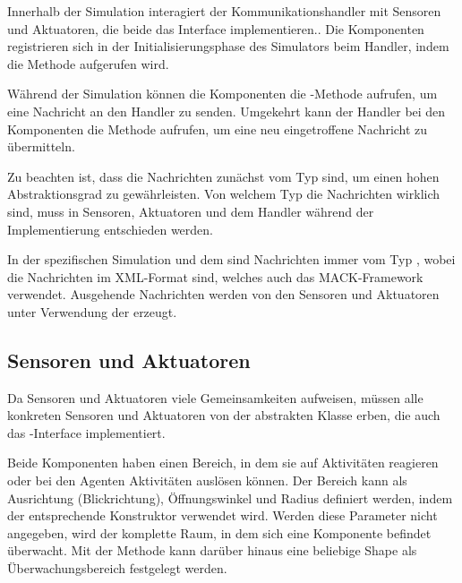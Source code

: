 Innerhalb der Simulation interagiert der Kommunikationshandler mit Sensoren und Aktuatoren, die beide das Interface  implementieren.. Die Komponenten registrieren sich in der Initialisierungsphase des Simulators beim Handler, indem die Methode  aufgerufen wird.

Während der Simulation können die Komponenten die -Methode aufrufen, um eine Nachricht an den Handler zu senden. Umgekehrt kann der Handler bei den Komponenten die Methode  aufrufen, um eine neu eingetroffene Nachricht zu übermitteln.

Zu beachten ist, dass die Nachrichten zunächst vom Typ  sind, um einen hohen Abstraktionsgrad zu gewährleisten. Von welchem Typ die Nachrichten wirklich sind, muss in Sensoren, Aktuatoren und dem Handler während der Implementierung entschieden werden.

In der spezifischen Simulation und dem  sind Nachrichten immer vom Typ , wobei die Nachrichten im XML-Format sind, welches auch das MACK-Framework verwendet. Ausgehende Nachrichten werden von den Sensoren und Aktuatoren unter Verwendung der  erzeugt.


\subsection{Sensoren und Aktuatoren}\label{subsec:concept_actuators_sensors}
Da Sensoren und Aktuatoren viele Gemeinsamkeiten aufweisen, müssen alle konkreten Sensoren und Aktuatoren von der abstrakten Klasse  erben, die auch das -Interface implementiert.

Beide Komponenten haben einen Bereich, in dem sie auf Aktivitäten reagieren oder bei den Agenten Aktivitäten auslösen können. Der Bereich kann als Ausrichtung (Blickrichtung), Öffnungswinkel und Radius definiert werden, indem der entsprechende Konstruktor verwendet wird. Werden diese Parameter nicht angegeben, wird der komplette Raum, in dem sich eine Komponente befindet überwacht. Mit der Methode  kann darüber hinaus eine beliebige Shape als Überwachungsbereich festgelegt werden.

